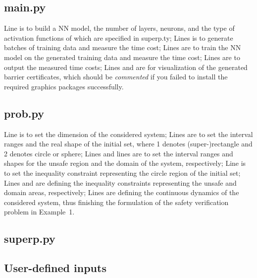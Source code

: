 \documentclass{llncs}
\begin{document}
\subsection{\textsf{main.py}}
Line 
is to build a NN model, the number of layers, neurons, and the type of activation functions of which are specified in \textsf{superp.ty};
Lines
is to generate batches of training data and measure the time cost; 
Lines
are to train the NN model on the generated training data and measure the time cost;
Lines
are to output the measured time costs; Lines
and
are for visualization of the generated barrier certificates, which should be \emph{commented} if you
failed to install the required graphics packages successfully.

\subsection{\textsf{prob.py}}
Line
is to set the dimension of the considered system; Lines
are to set the interval ranges and the real shape of the initial set, where 1 denotes (super-)rectangle and 
2 denotes circle or sphere; Lines
and lines
are to set the interval ranges and shapes for the unsafe region and the domain of the system, respectively;
Line 
is to set the inequality constraint representing the circle region of the initial set; Lines
and 
are defining the inequality constraints representing the unsafe and domain areas, respectively;
Lines
are defining the continuous dynamics of the considered system, thus finishing the formulation of the
safety verification problem in Example~1.

\subsection{\textsf{superp.py}}

\subsection{User-defined inputs}
\end{document}
